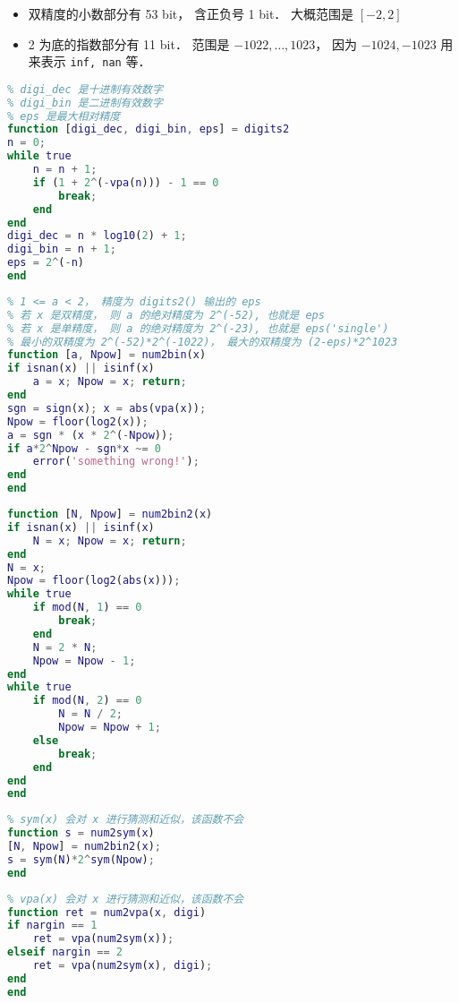 

\begin{itemize}
\item 双精度的小数部分有 53 bit， 含正负号 1 bit． 大概范围是 $[-2,2]$
\item 2 为底的指数部分有 11 bit． 范围是 $-1022,\dots,1023$， 因为 $-1024, -1023$ 用来表示 \verb|inf, nan| 等．
\end{itemize}

\begin{lstlisting}[language=matlab, caption=digits2.m]
% 求当前 vpa 变精度计算的有效数字
% digi_dec 是十进制有效数字
% digi_bin 是二进制有效数字
% eps 是最大相对精度
function [digi_dec, digi_bin, eps] = digits2
n = 0;
while true
    n = n + 1;
    if (1 + 2^(-vpa(n))) - 1 == 0
        break;
    end
end
digi_dec = n * log10(2) + 1;
digi_bin = n + 1;
eps = 2^(-n)
end
\end{lstlisting}

\begin{lstlisting}[language=matlab, caption=num2bin.m]
% x = a*2^Npw (exactly)
% 1 <= a < 2， 精度为 digits2() 输出的 eps
% 若 x 是双精度， 则 a 的绝对精度为 2^(-52), 也就是 eps
% 若 x 是单精度， 则 a 的绝对精度为 2^(-23), 也就是 eps('single')
% 最小的双精度为 2^(-52)*2^(-1022)， 最大的双精度为 (2-eps)*2^1023
function [a, Npow] = num2bin(x)
if isnan(x) || isinf(x)
    a = x; Npow = x; return;
end
sgn = sign(x); x = abs(vpa(x));
Npow = floor(log2(x));
a = sgn * (x * 2^(-Npow));
if a*2^Npow - sgn*x ~= 0
    error('something wrong!');
end
end
\end{lstlisting}

\begin{lstlisting}[language=matlab, caption=num2bin2.m]
% 精确解出 x = N*2^Npow， 其中 N 是奇数和整数, Npow 是整数
function [N, Npow] = num2bin2(x)
if isnan(x) || isinf(x)
    N = x; Npow = x; return;
end
N = x;
Npow = floor(log2(abs(x)));
while true
    if mod(N, 1) == 0
        break;
    end
    N = 2 * N;
    Npow = Npow - 1;
end
while true
    if mod(N, 2) == 0
        N = N / 2;
        Npow = Npow + 1;
    else
        break;
    end
end
end
\end{lstlisting}

\begin{lstlisting}[language=matlab, caption=num2sym.m]
% 双精度转换为符号表达式
% sym(x) 会对 x 进行猜测和近似，该函数不会
function s = num2sym(x)
[N, Npow] = num2bin2(x);
s = sym(N)*2^sym(Npow);
end
\end{lstlisting}

\begin{lstlisting}[language=matlab, caption=num2vpa.m]
% 双精度转换为变精度浮点数
% vpa(x) 会对 x 进行猜测和近似，该函数不会
function ret = num2vpa(x, digi)
if nargin == 1
    ret = vpa(num2sym(x));
elseif nargin == 2
    ret = vpa(num2sym(x), digi);
end
end
\end{lstlisting}
